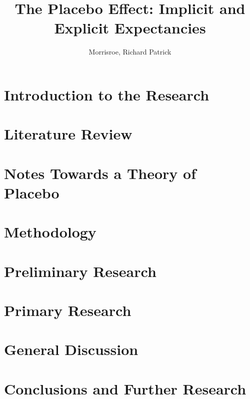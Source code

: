 \documentclass[phd,apsych,draft]{uccthesis}
\title{The Placebo Effect: Implicit and Explicit Expectancies}
\author{Morrisroe, Richard Patrick}
\begin{document}
\maketitle

\tableofcontents

\chapter{Introduction to the Research}



\chapter{Literature Review}



\chapter{Notes Towards a Theory of Placebo}



\chapter{Methodology}



\chapter{Preliminary Research}






\chapter{Primary Research}


\chapter{General Discussion}

\chapter{Conclusions and Further Research}





\end{document}
